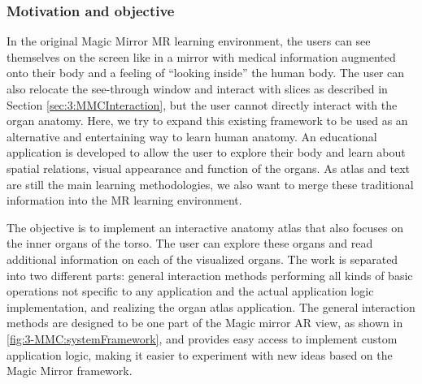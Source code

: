 \subsubsection{Motivation and objective}
In the original Magic Mirror MR learning environment, the users can see themselves on the screen like in a mirror with medical information augmented onto their body and a feeling of ``looking inside'' the human body. The user can also relocate the see-through window and interact with slices as described in Section \ref{sec:3:MMCInteraction}, but the user cannot directly interact with the organ anatomy. Here, we try to expand this existing framework to be used as an alternative and entertaining way to learn human anatomy. An educational application is developed to allow the user to explore their body and learn about spatial relations, visual appearance and function of the organs.
As atlas and text are still the main learning methodologies, we also want to merge these traditional information into the MR learning environment. 

The objective is to implement an interactive anatomy atlas that also focuses on the inner organs of the torso. The user can explore these organs and read additional information on each of the visualized organs. The work is separated into two different parts: general interaction methods performing all kinds of basic operations not specific to any application and the actual application logic implementation, and realizing the organ atlas application.
The general interaction methods are designed to be one part of the Magic mirror AR view, as shown in \figurename{\ref{fig:3-MMC:systemFramework}}, and provides easy access to implement custom application logic, making it easier to experiment with new ideas based on the Magic Mirror framework.

